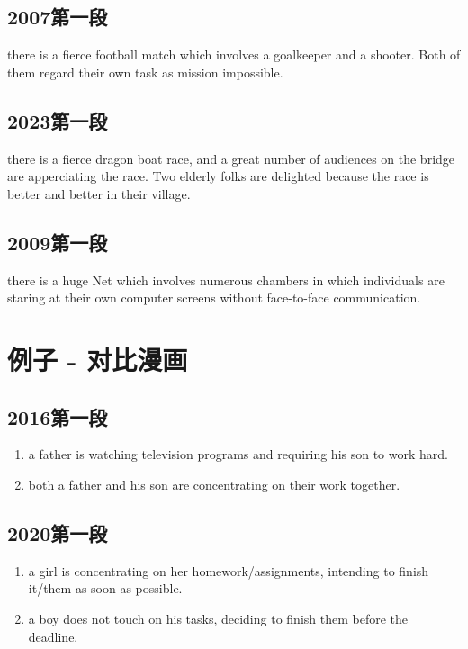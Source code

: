 \subsection{2007第一段}

there is a fierce football match which involves a goalkeeper and 
a shooter. Both of them regard their own task as mission impossible.

\subsection{2023第一段}

there is a fierce dragon boat race, and a great number of 
audiences on the bridge are apperciating the race. Two 
elderly folks are delighted because the race is better and 
better in their village.

\subsection{2009第一段}

there is a huge Net which involves numerous chambers 
in which individuals are staring at their own computer screens without 
face-to-face communication.

\section{例子 - 对比漫画}

\subsection{2016第一段}

\begin{enumerate}
    \item a father is watching television programs and requiring his son to work hard.
    \item both a father and his son are concentrating on their work together.
\end{enumerate}

\subsection{2020第一段}

\begin{enumerate}
    \item a girl is concentrating on her homework/assignments, 
    intending to finish it/them as soon as possible.
    \item a boy does not touch on his tasks, deciding to finish them before the deadline.
\end{enumerate}

